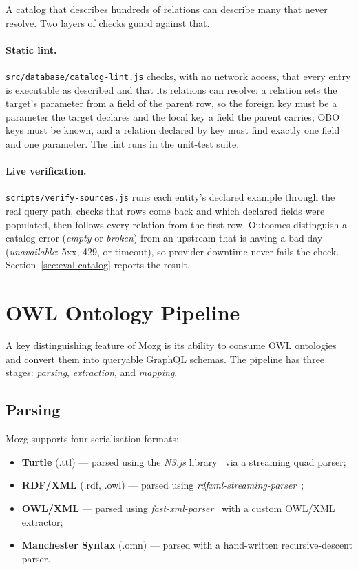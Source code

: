 \documentclass[sigconf,nonacm]{acmart}
\begin{document}
A catalog that describes hundreds of relations can describe many that
never resolve.  Two layers of checks guard against that.

\paragraph{Static lint.}
\texttt{src/database/catalog-lint.js} checks, with no network access,
that every entry is executable as described and that its relations can
resolve: a relation sets the target's parameter from a field of the
parent row, so the foreign key must be a parameter the target declares
and the local key a field the parent carries; OBO keys must be known,
and a relation declared by key must find exactly one field and one
parameter.  The lint runs in the unit-test suite.

\paragraph{Live verification.}
\texttt{scripts/verify-sources.js} runs each entity's declared example
through the real query path, checks that rows come back and which
declared fields were populated, then follows every relation from the
first row.  Outcomes distinguish a catalog error (\emph{empty} or
\emph{broken}) from an upstream that is having a bad day
(\emph{unavailable}: 5xx, 429, or timeout), so provider downtime never
fails the check.  Section~\ref{sec:eval-catalog} reports the result.

\section{OWL Ontology Pipeline}
\label{sec:ontology}

A key distinguishing feature of Mozg is its ability to consume
OWL ontologies and convert them into queryable GraphQL schemas.
The pipeline has three stages: \emph{parsing}, \emph{extraction},
and \emph{mapping}.

\subsection{Parsing}

Mozg supports four serialisation formats:

\begin{itemize}
  \item \textbf{Turtle} (.ttl) --- parsed using the \emph{N3.js}
        library~\cite{n3js} via a streaming quad parser;
  \item \textbf{RDF/XML} (.rdf, .owl) --- parsed using
        \emph{rdfxml-streaming-parser}~\cite{rdfxmlparser};
  \item \textbf{OWL/XML} --- parsed using \emph{fast-xml-parser}~\cite{fxp}
        with a custom OWL/XML extractor;
  \item \textbf{Manchester Syntax} (.omn) --- parsed with a hand-written
        recursive-descent parser.
\end{itemize}
\end{document}
